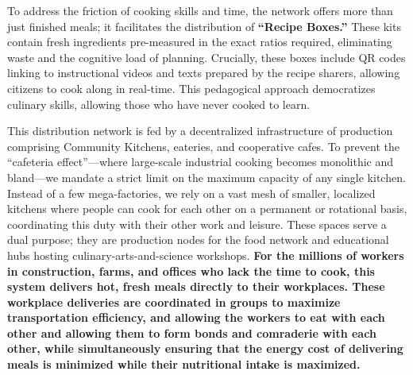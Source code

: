 To address the friction of cooking skills and time, the network offers
more than just finished meals; it facilitates the distribution of
\textbf{``Recipe Boxes.''} These kits contain fresh ingredients
pre-measured in the exact ratios required, eliminating waste and the
cognitive load of planning. Crucially, these boxes include QR codes
linking to instructional videos and texts prepared by the recipe
sharers, allowing citizens to cook along in real-time. This pedagogical
approach democratizes culinary skills, allowing those who have never
cooked to learn.

This distribution network is fed by a decentralized infrastructure of
production comprising Community Kitchens, eateries, and cooperative
cafes. To prevent the ``cafeteria effect''---where large-scale
industrial cooking becomes monolithic and bland---we mandate a strict
limit on the maximum capacity of any single kitchen. Instead of a few
mega-factories, we rely on a vast mesh of smaller, localized kitchens
where people can cook for each other on a permanent or rotational basis,
coordinating this duty with their other work and leisure. These spaces
serve a dual purpose; they are production nodes for the food network and
educational hubs hosting culinary-arts-and-science workshops.
\textbf{For the millions of workers in construction, farms, and offices
who lack the time to cook, this system delivers hot, fresh meals
directly to their workplaces. These workplace deliveries are coordinated
in groups to maximize transportation efficiency, and allowing the
workers to eat with each other and allowing them to form bonds and
comraderie with each other, while simultaneously ensuring that the
energy cost of delivering meals is minimized while their nutritional
intake is maximized.}

